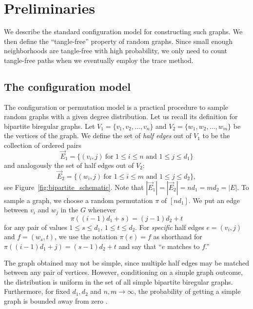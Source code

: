 \section{Preliminaries}
\label{sec:preliminaries}

We describe the standard configuration model for 
constructing such graphs.
We then define the ``tangle-free'' property of random graphs.
Since small enough neighborhoods are tangle-free with high probability, 
we only need to count tangle-free paths when we eventually employ the trace
method.

\subsection{The configuration model}

\label{sec:configuration_model}
The configuration or permutation model is a practical procedure to sample 
random graphs with a given degree distribution. 
Let us recall its definition for bipartite biregular graphs. 
Let $V_1=\{v_1,v_2,\dots,v_n\}$ and $V_2=\{w_1,w_2,\dots, w_m\}$ 
be the vertices of the graph. 
We define the set of \textit{half edges} out of $V_1$
to be the collection of ordered pairs
\[
\vec{E}_1=\{(v_i,j)~\mbox{for $1\leq i\leq n$ and $1\leq j\leq d_1$}\}
\]
and analogously the set of half edges out of $V_2$:
\[
\vec{E}_2=\{(w_i,j)~\mbox{for $1\leq i\leq m$ and $1\leq j\leq d_2$}\},
\]
see Figure~\ref{fig:bipartite_schematic}.
Note that $|\vec{E}_1|=|\vec{E}_2|=nd_1=md_2 = |E|$. 
To sample a graph, we choose a random permutation $\pi$ of 
$[n d_1]$. 
We put an edge between $v_i$ and $w_j$ in the $G$ whenever 
\[
\pi((i-1)d_1+s)=(j-1)d_2+t
\]
for any pair of values $1\leq s\leq d_1$, $1\leq t\leq d_2$. 
For {\em specific} half edges $e = (v_i, j)$ and $f = (w_s, t)$, 
we use the notation $\pi(e) = f$ as shorthand for
$\pi((i-1)d_1 + j) = (s-1)d_2 + t$ and say that
``$e$ matches to $f$.''

The graph obtained may not be simple, since multiple half edges may be matched 
between any pair of vertices. 
However, conditioning on a simple graph outcome, 
the distribution is uniform in the set of all 
simple bipartite biregular graphs. 
Furthermore, for fixed $d_1, d_2$ and $n,m \to \infty$,
the probability of getting a simple graph is bounded away from zero
\citep*{bollobas2001}.


